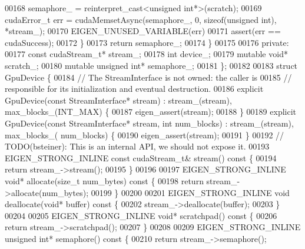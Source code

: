 \begin{DoxyCode}
00168       semaphore\_ = \textcolor{keyword}{reinterpret\_cast<}\textcolor{keywordtype}{unsigned} \textcolor{keywordtype}{int}*\textcolor{keyword}{>}(scratch);
00169       cudaError\_t err = cudaMemsetAsync(semaphore\_, 0, \textcolor{keyword}{sizeof}(\textcolor{keywordtype}{unsigned} \textcolor{keywordtype}{int}), *stream\_);
00170       EIGEN\_UNUSED\_VARIABLE(err)
00171       assert(err == cudaSuccess);
00172     \}
00173     \textcolor{keywordflow}{return} semaphore\_;
00174   \}
00175 
00176  \textcolor{keyword}{private}:
00177   \textcolor{keyword}{const} cudaStream\_t* stream\_;
00178   \textcolor{keywordtype}{int} device\_;
00179   \textcolor{keyword}{mutable} \textcolor{keywordtype}{void}* scratch\_;
00180   \textcolor{keyword}{mutable} \textcolor{keywordtype}{unsigned} \textcolor{keywordtype}{int}* semaphore\_;
00181 \};
00182 
00183 \textcolor{keyword}{struct }GpuDevice \{
00184   \textcolor{comment}{// The StreamInterface is not owned: the caller is}
00185   \textcolor{comment}{// responsible for its initialization and eventual destruction.}
00186   \textcolor{keyword}{explicit} GpuDevice(\textcolor{keyword}{const} StreamInterface* stream) : stream\_(stream), max\_blocks\_(INT\_MAX) \{
00187     eigen\_assert(stream);
00188   \}
00189   \textcolor{keyword}{explicit} GpuDevice(\textcolor{keyword}{const} StreamInterface* stream, \textcolor{keywordtype}{int} num\_blocks) : stream\_(stream), max\_blocks\_(
      num\_blocks) \{
00190     eigen\_assert(stream);
00191   \}
00192   \textcolor{comment}{// TODO(bsteiner): This is an internal API, we should not expose it.}
00193   EIGEN\_STRONG\_INLINE \textcolor{keyword}{const} cudaStream\_t& stream()\textcolor{keyword}{ const }\{
00194     \textcolor{keywordflow}{return} stream\_->stream();
00195   \}
00196 
00197   EIGEN\_STRONG\_INLINE \textcolor{keywordtype}{void}* allocate(\textcolor{keywordtype}{size\_t} num\_bytes)\textcolor{keyword}{ const }\{
00198     \textcolor{keywordflow}{return} stream\_->allocate(num\_bytes);
00199   \}
00200 
00201   EIGEN\_STRONG\_INLINE \textcolor{keywordtype}{void} deallocate(\textcolor{keywordtype}{void}* buffer)\textcolor{keyword}{ const }\{
00202     stream\_->deallocate(buffer);
00203   \}
00204 
00205   EIGEN\_STRONG\_INLINE \textcolor{keywordtype}{void}* scratchpad()\textcolor{keyword}{ const }\{
00206     \textcolor{keywordflow}{return} stream\_->scratchpad();
00207   \}
00208 
00209   EIGEN\_STRONG\_INLINE \textcolor{keywordtype}{unsigned} \textcolor{keywordtype}{int}* semaphore()\textcolor{keyword}{ const }\{
00210     \textcolor{keywordflow}{return} stream\_->semaphore();

\end{DoxyCode}
